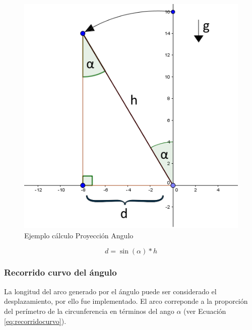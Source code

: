 \documentclass[12pt,a4paper]{article}
\begin{document}
\begin{figure}[H]
	\centering
	\includegraphics[scale=0.6]{images/calculoProyeccion}
	\caption{Ejemplo cálculo Proyección Angulo}
	\label{fig:proyeccion}
\end{figure}

\begin{equation}
	\label{eq:proyeccion}
	d=\sin(\alpha)*h
\end{equation}

\newpage
\subsubsection{Recorrido curvo del ángulo}
La longitud del arco generado por el ángulo puede ser considerado el desplazamiento, por ello fue implementado.
El arco correponde a la proporción del perímetro de la circunferencia en términos del ango $\alpha$ (ver Ecuación \ref{eq:recorridocurvo}).
\end{document}
